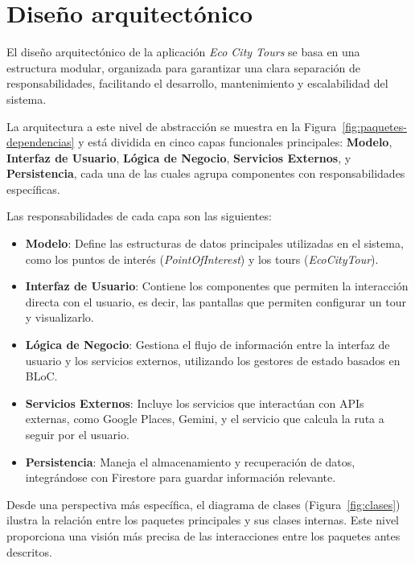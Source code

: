 \section{Diseño arquitectónico}

El diseño arquitectónico de la aplicación \textit{Eco City Tours} se basa en una estructura modular, organizada para garantizar una clara separación de responsabilidades, facilitando el desarrollo, mantenimiento y escalabilidad del sistema. 

La arquitectura a este nivel de abstracción se muestra en la Figura~\ref{fig:paquetes-dependencias} y está dividida en cinco capas funcionales principales: \textbf{Modelo}, \textbf{Interfaz de Usuario}, \textbf{Lógica de Negocio}, \textbf{Servicios Externos}, y \textbf{Persistencia}, cada una de las cuales agrupa componentes con responsabilidades específicas.



Las responsabilidades de cada capa son las siguientes:

\begin{itemize}
	\item \textbf{Modelo}: Define las estructuras de datos principales utilizadas en el sistema, como los puntos de interés (\textit{PointOfInterest}) y los tours (\textit{EcoCityTour}).
	\item \textbf{Interfaz de Usuario}: Contiene los componentes que permiten la interacción directa con el usuario, es decir, las pantallas que permiten configurar un tour y visualizarlo.
	\item \textbf{Lógica de Negocio}: Gestiona el flujo de información entre la interfaz de usuario y los servicios externos, utilizando los gestores de estado basados en BLoC.
	\item \textbf{Servicios Externos}: Incluye los servicios que interactúan con APIs externas, como Google Places, Gemini, y el servicio que calcula la ruta a seguir por el usuario.
	\item \textbf{Persistencia}: Maneja el almacenamiento y recuperación de datos, integrándose con Firestore para guardar información relevante.
\end{itemize}

Desde una perspectiva más específica, el diagrama de clases (Figura~\ref{fig:clases}) ilustra la relación entre los paquetes principales y sus clases internas. Este nivel proporciona una visión más precisa de las interacciones entre los paquetes antes descritos.


